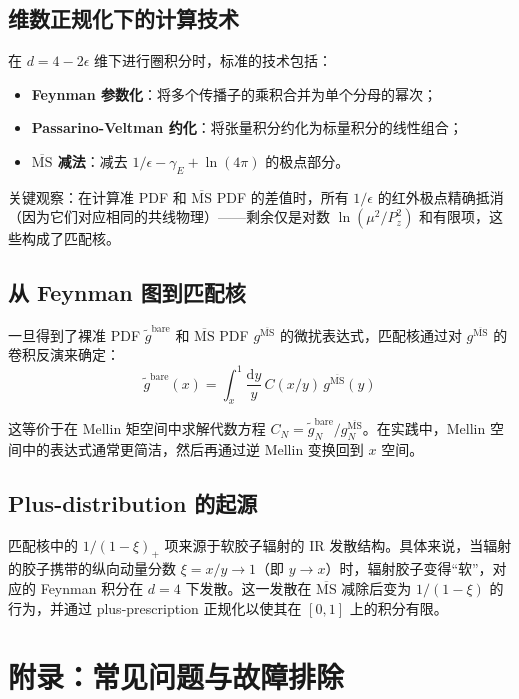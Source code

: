 \documentclass[11pt,a4paper]{ctexart}
\begin{document}
\subsection{维数正规化下的计算技术}

在 $d = 4 - 2\epsilon$ 维下进行圈积分时，标准的技术包括：
\begin{itemize}
  \item \textbf{Feynman 参数化}：将多个传播子的乘积合并为单个分母的幂次；
  \item \textbf{Passarino-Veltman 约化}：将张量积分约化为标量积分的线性组合；
  \item \textbf{$\overline{\text{MS}}$ 减法}：减去 $1/\epsilon - \gamma_E + \ln(4\pi)$ 的极点部分。
\end{itemize}

关键观察：在计算准 PDF 和 $\overline{\text{MS}}$ PDF 的差值时，所有 $1/\epsilon$ 的红外极点精确抵消（因为它们对应相同的共线物理）——剩余仅是对数 $\ln(\mu^2/P_z^2)$ 和有限项，这些构成了匹配核。

\subsection{从 Feynman 图到匹配核}

一旦得到了裸准 PDF $\tilde{g}^{\text{bare}}$ 和 $\overline{\text{MS}}$ PDF $g^{\overline{\text{MS}}}$ 的微扰表达式，匹配核通过对 $g^{\overline{\text{MS}}}$ 的卷积反演来确定：
\begin{equation}
\tilde{g}^{\text{bare}}(x) = \int_x^1 \frac{\mathrm{d}y}{y} \, C(x/y) \, g^{\overline{\text{MS}}}(y)
\end{equation}

这等价于在 Mellin 矩空间中求解代数方程 $C_N = \tilde{g}^{\text{bare}}_N / g^{\overline{\text{MS}}}_N$。在实践中，Mellin 空间中的表达式通常更简洁，然后再通过逆 Mellin 变换回到 $x$ 空间。

\subsection{Plus-distribution 的起源}

匹配核中的 $1/(1-\xi)_+$ 项来源于软胶子辐射的 IR 发散结构。具体来说，当辐射的胶子携带的纵向动量分数 $\xi = x/y \to 1$（即 $y \to x$）时，辐射胶子变得``软''，对应的 Feynman 积分在 $d=4$ 下发散。这一发散在 $\overline{\text{MS}}$ 减除后变为 $1/(1-\xi)$ 的行为，并通过 plus-prescription 正规化以使其在 $[0,1]$ 上的积分有限。

\section{附录：常见问题与故障排除}
\end{document}
